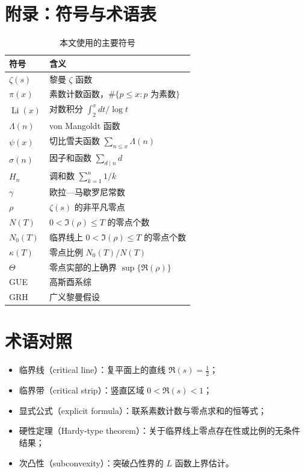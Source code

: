 \section{附录：符号与术语表}\label{sec:appendix}

\begin{table}[htbp]
    \centering
    \caption{本文使用的主要符号}
    \label{tab:notation}
    \begin{tabular}{ll}
        \toprule
        符号 & 含义 \\
        \midrule
        $\zeta(s)$ & 黎曼 $\zeta$ 函数 \\
        $\pi(x)$ & 素数计数函数，$\#\{p \le x: p \text{ 为素数}\}$ \\
        $\operatorname{Li}(x)$ & 对数积分 $\int_2^x dt/\log t$ \\
        $\Lambda(n)$ & von Mangoldt 函数 \\
        $\psi(x)$ & 切比雪夫函数 $\sum_{n \le x} \Lambda(n)$ \\
        $\sigma(n)$ & 因子和函数 $\sum_{d \mid n} d$ \\
        $H_n$ & 调和数 $\sum_{k=1}^{n} 1/k$ \\
        $\gamma$ & 欧拉—马歇罗尼常数 \\
        $\rho$ & $\zeta(s)$ 的非平凡零点 \\
        $N(T)$ & $0 < \Im(\rho) \le T$ 的零点个数 \\
        $N_0(T)$ & 临界线上 $0 < \Im(\rho) \le T$ 的零点个数 \\
        $\kappa(T)$ & 零点比例 $N_0(T)/N(T)$ \\
        $\Theta$ & 零点实部的上确界 $\sup\{\Re(\rho)\}$ \\
        GUE & 高斯酉系综 \\
        GRH & 广义黎曼假设 \\
        \bottomrule
    \end{tabular}
\end{table}

\section*{术语对照}
\begin{itemize}
    \item 临界线（critical line）：复平面上的直线 $\Re(s) = \tfrac{1}{2}$；
    \item 临界带（critical strip）：竖直区域 $0 < \Re(s) < 1$；
    \item 显式公式（explicit formula）：联系素数计数与零点求和的恒等式；
    \item 硬性定理（Hardy-type theorem）：关于临界线上零点存在性或比例的无条件结果；
    \item 次凸性（subconvexity）：突破凸性界的 $L$ 函数上界估计。
\end{itemize}
